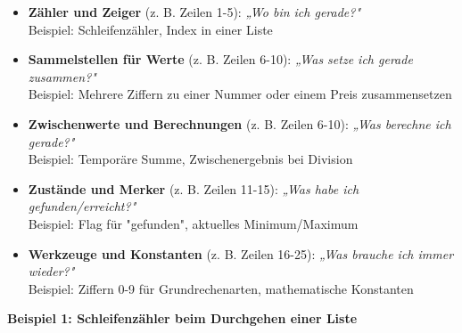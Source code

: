 \documentclass{article}
\begin{document}
        \begin{itemize}
          \item \textbf{Zähler und Zeiger} (z. B. Zeilen 1-5): \emph{„Wo bin ich gerade?"}\\
              Beispiel: Schleifenzähler, Index in einer Liste
          

          \item \textbf{Sammelstellen für Werte} (z. B. Zeilen 6-10): \emph{„Was setze ich gerade zusammen?"}\\
            Beispiel: Mehrere Ziffern zu einer Nummer oder einem Preis zusammensetzen
          

          \item \textbf{Zwischenwerte und Berechnungen} (z. B. Zeilen 6-10): \emph{„Was berechne ich gerade?"}\\
              Beispiel: Temporäre Summe, Zwischenergebnis bei Division
          

          \item \textbf{Zustände und Merker} (z. B. Zeilen 11-15): \emph{„Was habe ich gefunden/erreicht?"}\\
              Beispiel: Flag für "gefunden", aktuelles Minimum/Maximum
          

          \item \textbf{Werkzeuge und Konstanten} (z. B. Zeilen 16-25): \emph{„Was brauche ich immer wieder?"}\\
              Beispiel: Ziffern 0-9 für Grundrechenarten, mathematische Konstanten
          

        \end{itemize}

        
\textbf{Beispiel 1: Schleifenzähler beim Durchgehen einer Liste}
\end{document}
